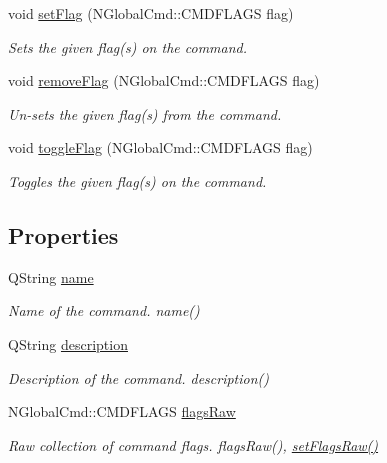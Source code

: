 \begin{DoxyCompactItemize}
void \hyperlink{class_base_console_command_a3046da732d30b1de8b41f51d146b5e46}{set\-Flag} (N\-Global\-Cmd\-::\-C\-M\-D\-F\-L\-A\-G\-S flag)
\begin{DoxyCompactList}\small\item\em Sets the given flag(s) on the command. \end{DoxyCompactList}\item 
void \hyperlink{class_base_console_command_a074b1ecedbef610eaa4a0e9d378f9da9}{remove\-Flag} (N\-Global\-Cmd\-::\-C\-M\-D\-F\-L\-A\-G\-S flag)
\begin{DoxyCompactList}\small\item\em Un-\/sets the given flag(s) from the command. \end{DoxyCompactList}\item 
void \hyperlink{class_base_console_command_a509caa8e6fba5c10e9ff89dd5fb665cf}{toggle\-Flag} (N\-Global\-Cmd\-::\-C\-M\-D\-F\-L\-A\-G\-S flag)
\begin{DoxyCompactList}\small\item\em Toggles the given flag(s) on the command. \end{DoxyCompactList}\end{DoxyCompactItemize}
\subsection*{Properties}
\begin{DoxyCompactItemize}
\item 
\hypertarget{class_base_console_command_a2f21764f46a3864a362eae2e3396e363}{Q\-String \hyperlink{class_base_console_command_a2f21764f46a3864a362eae2e3396e363}{name}}\label{class_base_console_command_a2f21764f46a3864a362eae2e3396e363}

\begin{DoxyCompactList}\small\item\em Name of the command.  name() \end{DoxyCompactList}\item 
\hypertarget{class_base_console_command_afcb44c52f870b7ca902da018c365b758}{Q\-String \hyperlink{class_base_console_command_afcb44c52f870b7ca902da018c365b758}{description}}\label{class_base_console_command_afcb44c52f870b7ca902da018c365b758}

\begin{DoxyCompactList}\small\item\em Description of the command.  description() \end{DoxyCompactList}\item 
\hypertarget{class_base_console_command_af736ebf1192e20424a3b738422cb55dc}{N\-Global\-Cmd\-::\-C\-M\-D\-F\-L\-A\-G\-S \hyperlink{class_base_console_command_af736ebf1192e20424a3b738422cb55dc}{flags\-Raw}}\label{class_base_console_command_af736ebf1192e20424a3b738422cb55dc}

\begin{DoxyCompactList}\small\item\em Raw collection of command flags.  flags\-Raw(), \hyperlink{class_base_console_command_ac6ff6169ab06ae43d76d0b3c2e5336ff}{set\-Flags\-Raw()} \end{DoxyCompactList}\end{DoxyCompactItemize}


